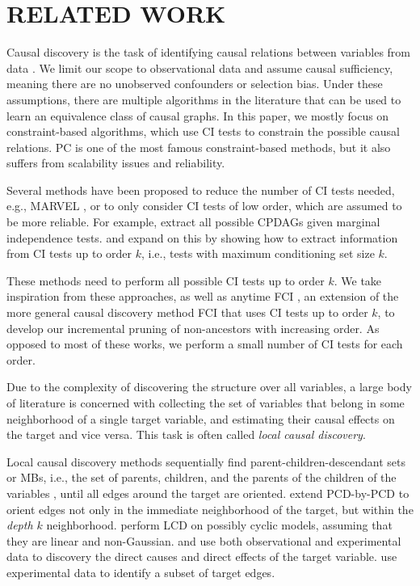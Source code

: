 \section{RELATED WORK}
\label{sec:related_work}

Causal discovery is the task of identifying causal relations between variables from data \citep{glymour2019review}.
We limit our scope to observational data and assume causal sufficiency, meaning there are no unobserved confounders or selection bias.
Under these assumptions, there are multiple algorithms in the literature that can be used to learn an equivalence class of causal graphs. In this paper, we mostly focus on constraint-based algorithms, which use \ac{CI} tests to constrain the possible causal relations. PC \citep{spirtes2000causation} is one of the most famous constraint-based methods, but it also suffers from scalability issues and reliability. 

Several methods have been proposed to reduce the number of CI tests needed, e.g., MARVEL \citep{mokhtarian2021recursive}, or to only consider \ac{CI} tests of low order, which are assumed to be more reliable. For example, \citet{textor2015learning} extract all possible \acp{CPDAG} given marginal independence tests.
\citet{wienobst2020recovering} and \citet{kocaoglu2024characterization} expand on this by showing how to extract information from \ac{CI} tests up to order $k$, i.e., tests with maximum conditioning set size $k$.

These methods need to perform all possible \ac{CI} tests up to order $k$. We take inspiration from these approaches, as well as anytime FCI \citep{pmlr-vR3-spirtes01a}, an extension of the more general causal discovery method FCI \citep{spirtes2000causation} that uses CI tests up to order $k$, to develop our incremental pruning of non-ancestors with increasing order.
As opposed to most of these works, we perform a small number of CI tests for each order.

Due to the complexity of discovering the structure over all variables, a large body of literature is concerned with collecting the set of variables that belong in some neighborhood of a single target variable, and estimating their causal effects on the target and vice versa. This task is often called  \emph{local causal discovery}.

Local causal discovery methods sequentially find parent-children-descendant sets \citep{yin2008partial} or \acp{MB}, i.e., the set of parents, children, and the parents of the children of the variables \citep{wang2014discovering,gao2015local,ling2020using},   
until all edges around the target are oriented.
\citet{zhou2010discover} extend PCD-by-PCD \citep{yin2008partial}  to orient edges not only in the immediate neighborhood of the target, but within the \textit{depth $k$} neighborhood.
\citet{dai2024local} perform \acl{LCD} on possibly cyclic models, assuming that they are linear and non-Gaussian.
\citet{statnikov15ultra} and \citet{shiragur2023meek} use both observational and experimental data to discovery the direct causes and direct effects of the target variable.
\citet{choo2023subset} use experimental data to identify a subset of  target edges.

